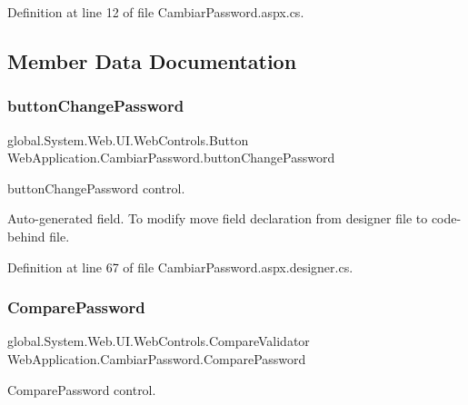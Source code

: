 Definition at line 12 of file Cambiar\+Password.\+aspx.\+cs.



\subsection{Member Data Documentation}
\mbox{\label{classWebApplication_1_1CambiarPassword_aa8f164fc829e197e0c1ae3f47e1881bf}} 
\subsubsection{\texorpdfstring{buttonChangePassword}{buttonChangePassword}}
{\footnotesize\ttfamily global.\+System.\+Web.\+U\+I.\+Web\+Controls.\+Button Web\+Application.\+Cambiar\+Password.\+button\+Change\+Password\hspace{0.3cm}{\ttfamily [protected]}}



button\+Change\+Password control. 

Auto-\/generated field. To modify move field declaration from designer file to code-\/behind file. 

Definition at line 67 of file Cambiar\+Password.\+aspx.\+designer.\+cs.

\mbox{\label{classWebApplication_1_1CambiarPassword_a3fc2ada75f8161ccd3708ad44d98a0be}} 
\subsubsection{\texorpdfstring{ComparePassword}{ComparePassword}}
{\footnotesize\ttfamily global.\+System.\+Web.\+U\+I.\+Web\+Controls.\+Compare\+Validator Web\+Application.\+Cambiar\+Password.\+Compare\+Password\hspace{0.3cm}{\ttfamily [protected]}}



Compare\+Password control. 

